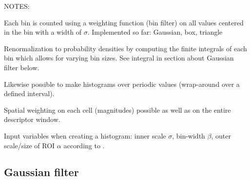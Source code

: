 \documentclass[thesis.tex]{subfiles}
\begin{document}
NOTES:

Each bin is counted using a weighting function (bin filter) on all values centered in the bin with a width of $\sigma$.
Implemented so far: Gaussian, box, triangle

Renormalization to probability densities by computing the finite integrals of each bin which allows for varying bin sizes. See integral in section about Gaussian filter below.

Likewise possible to make histograms over periodic values (wrap-around over a defined interval).

Spatial weighting on each cell (magnitudes) possible as well as on the entire descriptor window.

Input variables when creating a histogram: inner scale $\sigma$, bin-width $\beta$, outer scale/size of ROI $\alpha$ according to \citet{koenderink1999structure}.



\subsection{Gaussian filter}
\end{document}
